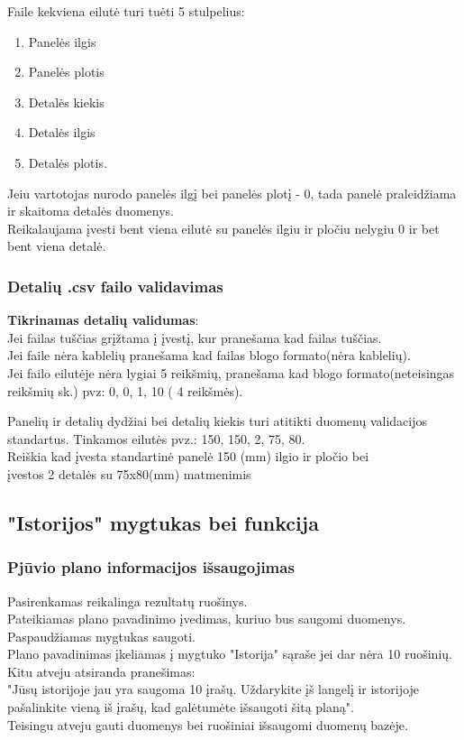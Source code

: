 \documentclass[a4paper,12pt]{article}
\begin{document}
Faile  kekviena eilutė turi tuėti 5 stulpelius:
\begin{enumerate}
	\item Panelės ilgis
	\item Panelės plotis
	\item Detalės kiekis
	\item Detalės ilgis
	\item Detalės plotis.
\end{enumerate}

Jeiu vartotojas nurodo panelės ilgį bei panelės plotį - 0, tada panelė praleidžiama ir skaitoma detalės duomenys. \\
Reikalaujama įvesti bent viena eilutė su panelės ilgiu ir pločiu nelygiu 0 ir bet bent viena detalė.

\subsubsection{Detalių .csv failo validavimas}
\textbf{Tikrinamas detalių validumas}:\\
	Jei failas tuščias grįžtama į įvestį, kur pranešama kad failas tuščias. \\
	Jei faile nėra kablelių pranešama kad failas blogo formato(nėra kablelių). \\
	Jei failo eilutėje nėra lygiai 5 reikšmių, pranešama kad blogo formato(neteisingas reikšmių sk.) pvz: 0, 0, 1, 10 ( 4 reikšmės).
	
	
	Panelių ir detalių dydžiai bei detalių kiekis turi atitikti duomenų validacijos standartus. 
Tinkamos eilutės pvz.: 150, 150, 2, 75, 80. \\
	Reiškia kad įvesta standartinė panelė 150 (mm) ilgio ir pločio bei \\
	įvestos 2 detalės su 75x80(mm) matmenimis



\subsection{"Istorijos" mygtukas bei funkcija}

\subsubsection{Pjūvio plano informacijos išsaugojimas}
Pasirenkamas reikalinga rezultatų ruošinys. \\
Pateikiamas plano pavadinimo įvedimas, kuriuo bus saugomi duomenys. \\
Paspaudžiamas mygtukas saugoti. \\
Plano pavadinimas įkeliamas į mygtuko "Istorija" sąraše jei dar nėra 10 ruošinių.\\
Kitu atveju atsiranda pranešimas: \\
"Jūsų istorijoje jau yra saugoma 10 įrašų. Uždarykite įš langelį ir istorijoje pašalinkite vieną iš įrašų, kad galėtumėte išsaugoti šitą planą". \\
Teisingu atveju gauti duomenys bei ruošiniai išsaugomi duomenų bazėje.
\end{document}
